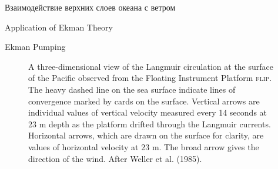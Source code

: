 \begin{chapter}{Взаимодействие верхних слоев океана с ветром}
\begin{section}{Application of Ekman Theory}
\begin{paragraph}{Ekman Pumping}
\begin{figure}[t!]
\caption{A three-dimensional view of the Langmuir circulation at the
surface of the Pacific observed from the Floating Instrument Platform
\textsc{flip}. The heavy dashed line on the sea surface indicate lines
of convergence marked by cards on the surface. Vertical arrows are
individual values of vertical velocity measured every 14 seconds at 23
m depth as the platform drifted through the Langmuir
currents. Horizontal arrows, which are drawn on the surface for
clarity, are values of horizontal velocity at 23 m. The broad arrow
gives the direction of the wind. After Weller et al. (1985).}
\label{fig:langmuir}
\end{figure}
%
\end{paragraph}
\end{section}


\end{chapter}
